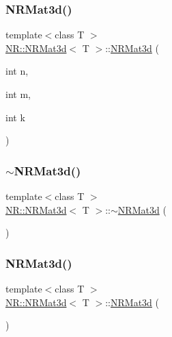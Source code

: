 \mbox{\label{classNR_1_1NRMat3d_a72437875f6affe5898dee887c3ebfe4c}} 
\subsubsection{\texorpdfstring{NRMat3d()}{NRMat3d()}\hspace{0.1cm}{\footnotesize\ttfamily [2/6]}}
{\footnotesize\ttfamily template$<$class T $>$ \\
\mbox{\hyperlink{classNR_1_1NRMat3d}{N\+R\+::\+N\+R\+Mat3d}}$<$ T $>$\+::\mbox{\hyperlink{classNR_1_1NRMat3d}{N\+R\+Mat3d}} (\begin{DoxyParamCaption}\item[{int}]{n,  }\item[{int}]{m,  }\item[{int}]{k }\end{DoxyParamCaption})}

\mbox{\label{classNR_1_1NRMat3d_a6c8dc36e24e162855f99ccfbc380ff52}} 
\subsubsection{\texorpdfstring{$\sim$NRMat3d()}{~NRMat3d()}\hspace{0.1cm}{\footnotesize\ttfamily [1/3]}}
{\footnotesize\ttfamily template$<$class T $>$ \\
\mbox{\hyperlink{classNR_1_1NRMat3d}{N\+R\+::\+N\+R\+Mat3d}}$<$ T $>$\+::$\sim$\mbox{\hyperlink{classNR_1_1NRMat3d}{N\+R\+Mat3d}} (\begin{DoxyParamCaption}{ }\end{DoxyParamCaption})}

\mbox{\label{classNR_1_1NRMat3d_a92498ec487349e85209cfad66e6b7d4e}} 
\subsubsection{\texorpdfstring{NRMat3d()}{NRMat3d()}\hspace{0.1cm}{\footnotesize\ttfamily [3/6]}}
{\footnotesize\ttfamily template$<$class T $>$ \\
\mbox{\hyperlink{classNR_1_1NRMat3d}{N\+R\+::\+N\+R\+Mat3d}}$<$ T $>$\+::\mbox{\hyperlink{classNR_1_1NRMat3d}{N\+R\+Mat3d}} (\begin{DoxyParamCaption}{ }\end{DoxyParamCaption})}

